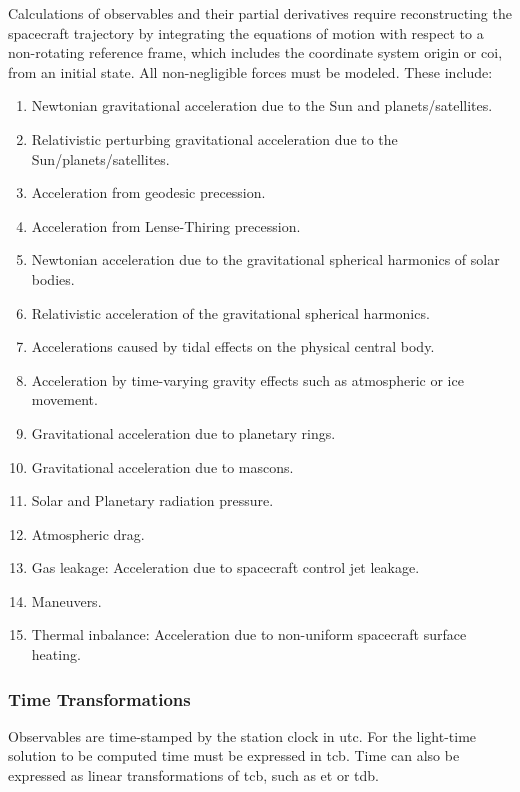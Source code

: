 \documentclass[oneside]{book}
\theoremstyle{mystyle}
\begin{document}
Calculations of observables and their partial derivatives require reconstructing the spacecraft trajectory by integrating the \gls{equations of motion} with respect to a non-rotating reference frame, which includes the coordinate system origin or \gls{coi}, from an initial state. All non-negligible forces must be modeled. These include:

\begin{enumerate}[itemsep=0pt]
\item Newtonian gravitational acceleration due to the Sun and planets/satellites.
\item Relativistic perturbing gravitational acceleration due to the Sun/planets/satellites.
\item Acceleration from geodesic precession.
\item Acceleration from Lense-Thiring precession.
\item Newtonian acceleration due to the gravitational spherical harmonics of solar bodies.
\item Relativistic acceleration of the gravitational spherical harmonics.
\item Accelerations caused by tidal effects on the physical central body.
\item Acceleration by time-varying gravity effects such as atmospheric or ice movement.
\item Gravitational acceleration due to planetary rings.
\item Gravitational acceleration due to mascons.
\item Solar and Planetary radiation pressure.
\item Atmospheric drag.
\item Gas leakage: Acceleration due to spacecraft control jet leakage.
\item Maneuvers.
\item Thermal inbalance: Acceleration due to non-uniform spacecraft surface heating.
\end{enumerate}

\subsubsection{\footnotesize Time Transformations}

\noindent Observables are time-stamped by the station clock in \gls{utc}. For the light-time solution to be computed time must be expressed in \gls{tcb}. Time can also be expressed as linear transformations of \gls{tcb}, such as \gls{et} or \gls{tdb}.
\end{document}
